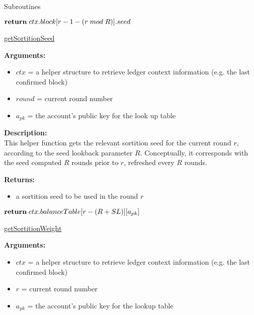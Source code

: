 \documentclass[10pt,a4paper]{article}
\begin{document}
\begin{section}{Subroutines}

\begin{algorithm}[H]\label{algo:get-sortition-seed}
    \begin{algorithmic}[1]
        
            $\Return\;ctx.block[r-1-(r\;mod\;R)].seed$

        \EndFunction
    \end{algorithmic}
    \caption{\underline{getSortitionSeed}}
\end{algorithm}

\noindent \textbf{Arguments:}
\begin{itemize}
    \item $ctx$ = a helper structure to retrieve ledger context information (e.g. the last confirmed block)
    \item $round$ = current round number
    \item $a_{pk}$ = the account's public key for the look up table
  \end{itemize}


\noindent \textbf{Description:}\\
This helper function gets the relevant sortition seed for the current round $r$, according to the seed 
lookback parameter $R$.
Conceptually, it corresponds with the seed computed $R$ rounds prior to $r$, refreshed every $R$ rounds.

\noindent \textbf{Returns:}
\begin{itemize}
    \item a sortition seed to be used in the round $r$
  \end{itemize}


\begin{algorithm}[H]\label{algo:get-sortition-weight}
    \begin{algorithmic}[1]

            $\Return\;ctx.balanceTable[r - (R + SL)][a_{pk}]$

        \EndFunction
    \end{algorithmic}
    \caption{\underline{getSortitionWeight}}
\end{algorithm}

\noindent \textbf{Arguments:}
\begin{itemize}
    \item $ctx$ = a helper structure to retrieve ledger context information (e.g. the last confirmed block)
    \item $r$ = current round number
    \item $a_{pk}$ = the account's public key for the lookup table
  \end{itemize}



\end{section}
\end{document}
